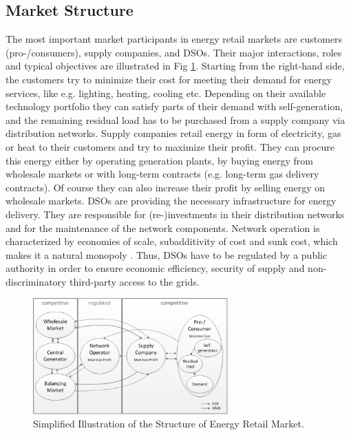 \documentclass[review]{elsarticle}
\begin{document}
\subsection{Market Structure}
\label{sec:econ-1}

The most important market participants in energy retail markets are
customers (pro-/consumers), supply companies, and DSOs. Their
major interactions, roles and typical objectives are illustrated in
Fig  \ref{fig:market_structure}. 
Starting from the right-hand side, the customers try to minimize their
cost for meeting their demand for energy services, like e.g. lighting,
heating, cooling etc. Depending on their available technology
portfolio they can satisfy parts of their demand with self-generation,
and the remaining residual load has to be purchased from a supply
company via distribution networks. 
Supply companies retail energy in form of electricity, gas or heat to
their customers and try to maximize their profit. They can procure
this energy either by operating generation plants, by buying energy
from wholesale markets or with long-term contracts (e.g. long-term gas
delivery contracts). Of course they can also increase their profit by
selling energy on wholesale markets. 
DSOs are providing the necessary infrastructure for energy
delivery. They are responsible for (re-)investments in their
distribution networks and for the maintenance of the network
components. Network operation is characterized by economies of scale,
subadditivity of cost and sunk cost, which makes it a natural
monopoly \cite{auer_2011}. Thus, DSOs have to be regulated by a public
authority in order to ensure economic efficiency, security of supply
and non-discriminatory third-party access to the grids.  

\begin{figure}[t]
  \centering
  \includegraphics[width=75mm]{figures/market_structure.png}
  \caption{Simplified Illustration of the Structure of Energy Retail
    Market.}
  \label{fig:market_structure}
\end{figure}
\end{document}
